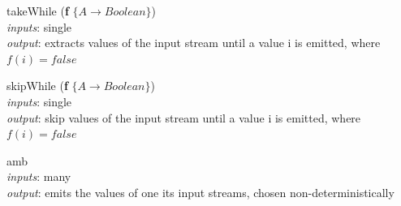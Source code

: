 \documentclass{dithesis}
\begin{document}
\begin{description}
\begin{minipage}[c]{0.4\linewidth}
\item[takeWhile] (\textbf{f} $\{ A \to Boolean \}$) \\
	\textit{inputs}: single \\
	\textit{output}: extracts values of the input stream until a value i is emitted, where $f(i) = false$
\end{minipage}
\begin{minipage}[c]{0.6\linewidth}

\end{minipage}

\begin{minipage}[c]{0.4\linewidth}
\item[skipWhile] (\textbf{f} $\{ A \to Boolean \}$) \\
	\textit{inputs}: single \\
	\textit{output}: skip values of the input stream until a value i is emitted, where $f(i) = false$
\end{minipage}
\begin{minipage}[c]{0.6\linewidth}

\end{minipage}

\begin{minipage}[c]{0.4\linewidth}
\item[amb] ~\\
	\textit{inputs}: many \\
	\textit{output}: emits the values of one its input streams, chosen non-deterministically
\end{minipage}
\begin{minipage}[c]{0.6\linewidth}

\end{minipage}

\end{description}
\end{document}
